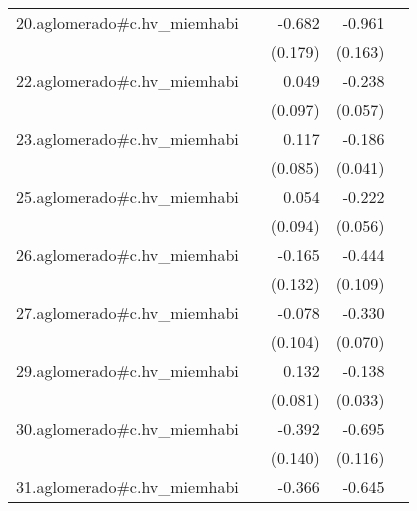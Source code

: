 {\begin{longtable}{l*{4}{D{.}{.}{-1}}}
\addlinespace
20.aglomerado#c.hv\_miemhabi&                     &      -0.682\sym{***}&      -0.961\sym{***}&                     \\
            &                     &     (0.179)         &     (0.163)         &                     \\
\addlinespace
22.aglomerado#c.hv\_miemhabi&                     &       0.049         &      -0.238\sym{***}&                     \\
            &                     &     (0.097)         &     (0.057)         &                     \\
\addlinespace
23.aglomerado#c.hv\_miemhabi&                     &       0.117         &      -0.186\sym{***}&                     \\
            &                     &     (0.085)         &     (0.041)         &                     \\
\addlinespace
25.aglomerado#c.hv\_miemhabi&                     &       0.054         &      -0.222\sym{***}&                     \\
            &                     &     (0.094)         &     (0.056)         &                     \\
\addlinespace
26.aglomerado#c.hv\_miemhabi&                     &      -0.165         &      -0.444\sym{***}&                     \\
            &                     &     (0.132)         &     (0.109)         &                     \\
\addlinespace
27.aglomerado#c.hv\_miemhabi&                     &      -0.078         &      -0.330\sym{***}&                     \\
            &                     &     (0.104)         &     (0.070)         &                     \\
\addlinespace
29.aglomerado#c.hv\_miemhabi&                     &       0.132         &      -0.138\sym{***}&                     \\
            &                     &     (0.081)         &     (0.033)         &                     \\
\addlinespace
30.aglomerado#c.hv\_miemhabi&                     &      -0.392\sym{**} &      -0.695\sym{***}&                     \\
            &                     &     (0.140)         &     (0.116)         &                     \\
\addlinespace
31.aglomerado#c.hv\_miemhabi&                     &      -0.366\sym{*}  &      -0.645\sym{***}&                     \\

\end{longtable}}

